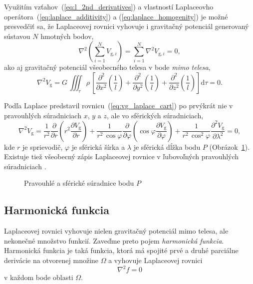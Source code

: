 \documentclass[a4paper, 12pt]{book}
\newcommand{\diff}{\mathrm d}
\newcommand{\gidx}{\mathrm g}
\begin{document}
Využitím vzťahov~(\ref{eq:l_2nd_derivatives}) a vlastností Laplaceovho 
operátora~(\ref{eq:laplace_additivity}) a (\ref{eq:laplace_homogenity}) je 
možné presvedčiť sa, že Laplaceovej rovnici vyhovuje i gravitačný potenciál 
generovaný sústavou $N$ hmotných bodov,
%
\begin{equation}
\nabla^2 \left( \sum_{i = 1}^N V_{\gidx,i} \right) = \sum_{i = 1}^N \nabla^2 
V_{\gidx,i} = 0{,}
\end{equation}
%
ako aj gravitačný potenciál všeobecného telesa v bode \emph{mimo telesa},
%
\begin{equation}
\nabla^2 V_\gidx = G\, \iiint_\tau \rho \, \left[ \frac{\partial^2}{\partial 
x^2}\left(\frac{1}{l}\right) + \frac{\partial^2}{\partial 
y^2}\left(\frac{1}{l}\right) + \frac{\partial^2}{\partial 
z^2}\left(\frac{1}{l}\right) \right] \diff\tau = 0{.}
\end{equation}

Podľa \cite{MacMillan1930} Laplace predstavil 
rovnicu~(\ref{eq:vg_laplace_cart}) po prvýkrát nie v pravouhlých súradniciach 
$x$, $y$ a $z$, ale vo sférických súradniciach,
%
\begin{equation}
\label{eq:vg_laplace_sph}
\nabla^2 V_\gidx = \frac{1}{r^2} \frac{\partial}{\partial r} \left( r^2 
\frac{\partial V_\gidx}{\partial r} \right) + \frac{1}{r^2 \, \cos\varphi} 
\frac{\partial}{\partial \varphi} \left( \cos\varphi \frac{\partial 
V_\gidx}{\partial \varphi} \right) + \frac{1}{r^2 \, 
\cos^2\varphi}\frac{\partial^2 V_\gidx}{\partial \lambda^2} = 0{,}
\end{equation}
%
kde $r$ je sprievodič, $\varphi$ je sférická šírka a $\lambda$ je sférická 
dĺžka bodu $P$ (Obrázok~\ref{fig:cart_sph}).  Existuje tiež všeobecný zápis 
Laplaceovej rovnice v ľubovoľných pravouhlých súradniciach \citep[pozri 
napríklad][]{MoritzPhysicalGeodesy}.

\begin{figure}
\centering

\caption{Pravouhlé a sférické súradnice bodu $P$}
\label{fig:cart_sph}
\end{figure}


\subsection{Harmonická funkcia}

Laplaceovej rovnici vyhovuje nielen gravitačný potenciál mimo telesa, ale 
nekonečné množstvo funkcií.  Zaveďme preto pojem \emph{harmonická funkcia}.  
Harmonická funkcia je taká funkcia, ktorá má spojité prvé a druhé parciálne 
derivácie na otvorenej množine $\Omega$ a vyhovuje Laplaceovej rovnici
%
\begin{equation}
\nabla^2 f = 0
\end{equation}
%
v každom bode oblasti $\Omega$.
\end{document}
